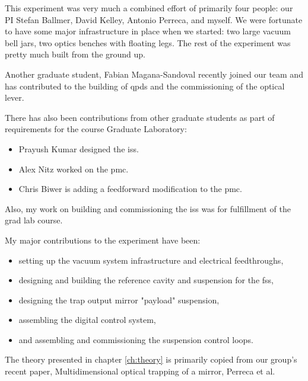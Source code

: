 \documentclass[12pt,notitlepage]{report}
\begin{document}
This experiment was very much a combined effort of primarily four people:
our PI Stefan Ballmer, David Kelley, Antonio Perreca, and myself.
We were fortunate to have some major infrastructure in place when we started:
two large vacuum bell jars, two optics benches with floating legs.
The rest of the experiment was pretty much built from the ground up.

Another graduate student, Fabian Magana-Sandoval recently joined our team
and has contributed to the building of \ac{qpd}s and the commissioning of the
optical lever.

There has also been contributions from other graduate students as part of
requirements for the course Graduate Laboratory:
\begin{itemize}
\item Prayush Kumar designed the \ac{iss}.
\item Alex Nitz worked on the \ac{pmc}.
\item Chris Biwer is adding a feedforward modification to the \ac{pmc}.
\end{itemize}
Also, my work on building and commissioning the \ac{iss} was for fulfillment of the
grad lab course.

My major contributions to the experiment have been:
\begin{itemize}
\item setting up the vacuum system infrastructure and electrical feedthroughs,
\item designing and building the reference cavity and suspension for the
  \ac{fss},
\item designing the trap output mirror "payload" suspension,
\item assembling the digital control system,
\item and assembling and commissioning the suspension control loops.
\end{itemize}

The theory presented in chapter \ref{ch:theory} is primarily copied from our
group's recent paper, Multidimensional optical trapping of a mirror,
Perreca et al. \cite{Perreca:2014}

%
%
%

%
\end{document}
